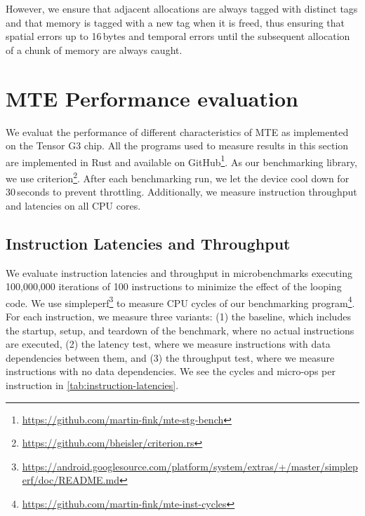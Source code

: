 However, we ensure that adjacent allocations are always tagged with distinct tags and that memory is tagged with a new tag when it is freed, thus ensuring that spatial errors up to 16\,bytes and temporal errors until the subsequent allocation of a chunk of memory are always caught.


\section{MTE Performance evaluation}
\label{sec:mte-performance-evaluation}

We evaluat the performance of different characteristics of \ac{MTE} as implemented on the Tensor G3 chip.
All the programs used to measure results in this section are implemented in Rust and available on GitHub\footnote{\url{https://github.com/martin-fink/mte-stg-bench}}.
As our benchmarking library, we use criterion\footnote{\url{https://github.com/bheisler/criterion.rs}}.
After each benchmarking run, we let the device cool down for 30\,seconds to prevent throttling.
Additionally, we measure instruction throughput and latencies on all CPU cores.

\subsection{Instruction Latencies and Throughput}\label{subsec:instruction-latencies-and-throughput}

We evaluate instruction latencies and throughput in microbenchmarks executing 100,000,000 iterations of 100 instructions to minimize the effect of the looping code.
We use simpleperf\footnote{\url{https://android.googlesource.com/platform/system/extras/+/master/simpleperf/doc/README.md}} to measure CPU cycles of our benchmarking program\footnote{\url{https://github.com/martin-fink/mte-inst-cycles}}.
For each instruction, we measure three variants: (1) the baseline, which includes the startup, setup, and teardown of the benchmark, where no actual instructions are executed, (2) the latency test, where we measure instructions with data dependencies between them, and (3) the throughput test, where we measure instructions with no data dependencies.
We see the cycles and micro-ops per instruction in \cref{tab:instruction-latencies}.

